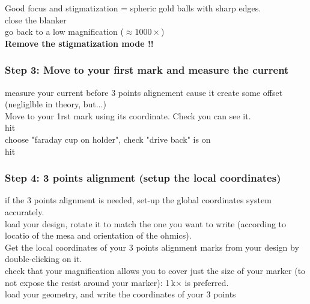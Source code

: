 Good focus and stigmatization = spheric gold balls with sharp edges.\\

close the blanker\\

go back to a low magnification ($\approx 1000 \times$)\\

\textbf{Remove the stigmatization mode !!}\\


\subsubsection{Step 3: Move to your first mark and measure the current}
measure your current before 3 points alignement cause it create some offset (negliglble in theory, but...)\\

Move to your 1rst mark using its coordinate. Check you can see it.\\

hit \\

choose "faraday cup on holder", check "drive back" is on\\

hit \\



\subsubsection{Step 4: 3 points alignment (setup the local coordinates)}

if the 3 points alignment is needed, set-up the global coordinates system accurately.\\

load your design, rotate it to match the one you want to write (according to locatio of the mesa and orientation of the ohmics).\\

Get the local coordinates of your 3 points alignment marks from your design by double-clicking on it.\\

check that your magnification allows you to cover just the size of your marker (to not expose the resist around your marker): 1\,k$\times$ is preferred.\\

load your geometry, and write the coordinates of your 3 points\\

